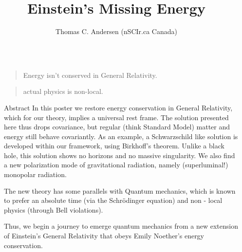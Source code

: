 \documentclass[final]{beamer}
\title{Einstein's Missing Energy}
\author{Thomas C. Andersen (nSCIr.ca Canada)}
\newlength{\sepwidth}
\newlength{\colwidth}
\newcommand{\separatorcolumn}{\begin{column}{\sepwidth}\end{column}}
\begin{document}

\begin{frame}[t]
\begin{columns}[t]
\separatorcolumn


\begin{column}{\colwidth}
\begin{quotation}
Energy isn't conserved in General Relativity.
\end{quotation}

\begin{quotation}
actual physics is non-local.
\end{quotation}



  \begin{block}{Abstract}
In this poster we restore energy conservation in General Relativity, which for our theory, implies a universal rest frame. The solution presented here thus drops covariance, but regular (think Standard Model) matter and energy still behave covariantly. As an example, a Schwarzschild like solution is developed within our framework, using Birkhoff's theorem. Unlike a black hole, this solution shows no horizons and no massive singularity. We also find a new polarization mode of gravitational radiation, namely (superluminal!) monopolar radiation.

The new theory has some parallels with Quantum mechanics, which is known to prefer an absolute time (via the Schrödinger equation) and non - local physics (through Bell violations).

Thus, we begin a journey to emerge quantum mechanics from a new extension of Einstein's General Relativity that obeys Emily Noether's energy conservation. 


\end{block}
\end{column}
\end{columns}
\end{frame}
\end{document}

